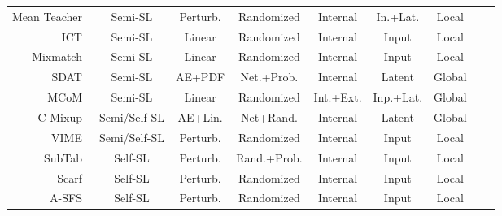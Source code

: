 \begin{longtable}{rcccccccc}
    Mean Teacher~\cite{tarvainen2017mean} & Semi-SL & Perturb. & Randomized & Internal & In.+Lat. & Local \\
    ICT~\cite{verma2022interpolation} & Semi-SL & Linear & Randomized & Internal & Input & Local \\
    Mixmatch~\cite{berthelot2019mixmatch} & Semi-SL & Linear & Randomized & Internal & Input & Local \\
    SDAT~\cite{fang2022semi} & Semi-SL & AE+PDF & Net.+Prob. & Internal & Latent & Global \\
    MCoM~\cite{li2022mcom} & Semi-SL & Linear & Randomized & Int.+Ext. & Inp.+Lat. & Global \\
    C-Mixup~\cite{darabi2021contrastive} & Semi/Self-SL & AE+Lin. & Net+Rand.  & Internal & Latent & Global \\
    VIME~\cite{yoon2020vime} & Semi/Self-SL & Perturb. & Randomized & Internal & Input & Local \\
    SubTab~\cite{ucar2021subtab} & Self-SL & Perturb. & Rand.+Prob. & Internal & Input & Local \\
    Scarf~\cite{bahri2022scarf} & Self-SL & Perturb. & Randomized & Internal & Input & Local \\
    A-SFS~\cite{qiu2022sfs} & Self-SL & Perturb. & Randomized & Internal & Input & Local \\
\end{longtable}
\endgroup


% 
% 
% 

